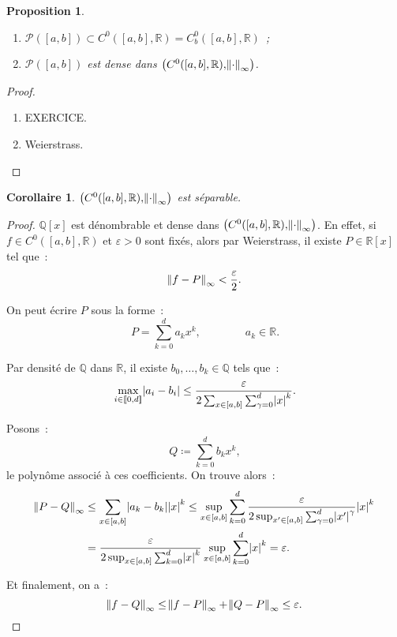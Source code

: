 \documentclass{report}
\newtheorem{prp}[thm]{Proposition}
\newtheorem{cor}[thm]{Corollaire}
\theoremstyle{definition}
\theoremstyle{remark}
\newcommand{\R}{\mathbb R}
\newcommand{\Q}{\mathbb Q}
\newcommand{\intint}[2]{\left\llbracket#1, #2\right\rrbracket}
\begin{document}
		\begin{prp}~
		\begin{enumerate}
			\item $\mathcal P([a, b]) \subset C^0([a, b], \R) = C^0_b([a, b], \R)$~;
			\item $\mathcal P([a, b])$ est dense dans $\left(C^0([a, b], \R), \norm \cdot_\infty\right)$.
		\end{enumerate}
		\end{prp}

		\begin{proof}~
		\begin{enumerate}
			\item EXERCICE.
			\item Weierstrass.
		\end{enumerate}
		\end{proof}

		\begin{cor} $\left(C^0([a, b], \R), \norm \cdot_\infty\right)$ est séparable.
		\end{cor}

		\begin{proof} $\Q[x]$ est dénombrable et dense dans $\left(C^0([a, b], \R), \norm \cdot_\infty\right)$. En effet, si $f \in C^0([a, b], \R)$ et
		$\varepsilon > 0$ sont fixés, alors par Weierstrass, il existe $P \in \R[x]$ tel que~:
		\[\norm {f-P}_\infty < \frac \varepsilon2.\]

		On peut écrire $P$ sous la forme~:
		\[P = \sum_{k=0}^da_kx^k,\qquad\qquad a_k \in \R.\]

		Par densité de $\Q$ dans $\R$, il existe $b_0, \ldots, b_k \in \Q$ tels que~:
		\[\max_{i \in \intint 0d}\abs {a_i-b_i} \leq \frac \varepsilon{2\sum_{x \in [a, b]}\sum_{\gamma = 0}^d\abs x^k}.\]

		Posons~:
		\[Q \coloneqq \sum_{k=0}^db_kx^k,\]
		le polynôme associé à ces coefficients. On trouve alors~:
		\begin{align*}
			\norm {P-Q}_\infty &\leq \sum_{x \in [a, b]}\abs {a_k-b_k}\abs x^k \leq \sup_{x \in [a, b]}\sum_{k=0}^d\frac \varepsilon{2\sup_{x' \in [a, b]}\sum_{\gamma=0}^d\abs {x'}^\gamma}\abs {x}^k \\
			&= \frac \varepsilon{2\sup_{x \in [a, b]}\sum_{k=0}^d\abs x^k}\sup_{x \in [a, b]}\sum_{k=0}^d\abs x^k = \varepsilon.
		\end{align*}

		Et finalement, on a~:
		\[\norm {f-Q}_\infty \leq \norm {f-P}_\infty + \norm {Q-P}_\infty \leq \varepsilon.\]
		\end{proof}
\end{document}

